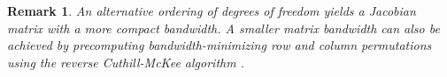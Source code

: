 \documentclass{article}
\newtheorem*{remark}{Remark}
\newcommand{\diag}[1]{{\rm diag}\LRp{#1}}
\newcommand{\td}[2]{\frac{{\rm d}#1}{{\rm d}{ {#2}}}}
\newcommand{\LRp}[1]{\left( #1 \right)}
\newcommand{\eq}[1]{\begin{align*}#1\end{align*}}
\newcommand{\eqlab}[1]{\begin{align}#1\end{align}}
\newcommand{\bmat}[1]{\begin{bmatrix}#1\end{bmatrix}}
\begin{document}
\begin{remark}
An alternative ordering of degrees of freedom \cite{crean2018entropy} yields a Jacobian matrix with a more compact bandwidth.   A smaller matrix bandwidth can also be achieved by precomputing bandwidth-minimizing row and column permutations using the reverse Cuthill-McKee algorithm \cite{cuthill1969reducing}.  
\end{remark}
\end{document}
